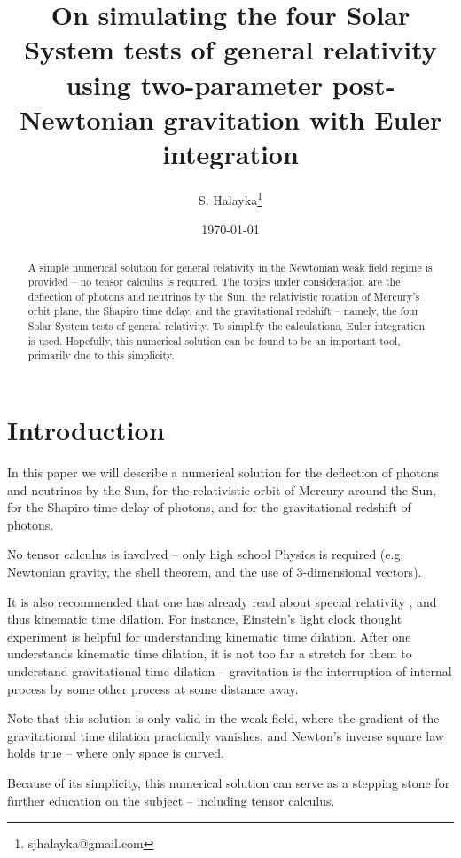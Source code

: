 \documentclass[12pt]{article}
\title{On simulating the four Solar System tests of general relativity using two-parameter post-Newtonian gravitation with Euler integration}
\author{S. Halayka\footnote{sjhalayka@gmail.com}}
\date{\today\;\currenttime}
\begin{document}
 
\maketitle

\begin{abstract}
A simple numerical solution for general relativity in the Newtonian weak field regime is provided -- no tensor calculus is required.
The topics under consideration are the deflection of photons and neutrinos by the Sun, the relativistic rotation of Mercury's orbit plane, the Shapiro time delay, and the gravitational redshift -- namely, the four Solar System tests of general relativity.
To simplify the calculations, Euler integration is used.
Hopefully, this numerical solution can be found to be an important tool, primarily due to this simplicity.
\end{abstract}


\section{Introduction}

In this paper we will describe a numerical solution for the deflection of photons and neutrinos by the Sun, for the relativistic orbit of Mercury around the Sun, for the Shapiro time delay of photons, and for the gravitational redshift of photons.

No tensor calculus is involved -- only high school Physics is required (e.g. Newtonian gravity, the shell theorem, and the use of 3-dimensional vectors).

It is also recommended that one has already read about special relativity \cite{einstein, morin}, and thus kinematic time dilation.
For instance, Einstein's light clock thought experiment is helpful for understanding kinematic time dilation.
After one understands kinematic time dilation, it is not too far a stretch for them to understand gravitational time dilation -- gravitation is the interruption of internal process by some other process at some distance away.

Note that this solution is only valid in the weak field, where the gradient of the gravitational time dilation practically vanishes, and Newton's inverse square law holds true -- where only space is curved.

Because of its simplicity, this numerical solution can serve as a stepping stone for further education on the subject -- including tensor calculus.
\end{document}
